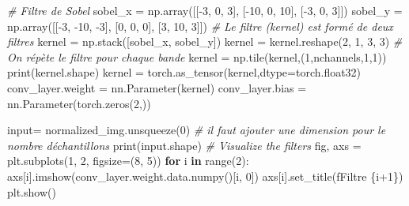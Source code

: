 \documentclass[
]{article}
\newenvironment{Shaded}{}{}
\newcommand{\BuiltInTok}[1]{\textcolor[rgb]{0.00,0.50,0.00}{#1}}
\newcommand{\CommentTok}[1]{\textcolor[rgb]{0.38,0.63,0.69}{\textit{#1}}}
\newcommand{\ControlFlowTok}[1]{\textcolor[rgb]{0.00,0.44,0.13}{\textbf{#1}}}
\newcommand{\DecValTok}[1]{\textcolor[rgb]{0.25,0.63,0.44}{#1}}
\newcommand{\KeywordTok}[1]{\textcolor[rgb]{0.00,0.44,0.13}{\textbf{#1}}}
\newcommand{\NormalTok}[1]{#1}
\newcommand{\OperatorTok}[1]{\textcolor[rgb]{0.40,0.40,0.40}{#1}}
\newcommand{\SpecialCharTok}[1]{\textcolor[rgb]{0.25,0.44,0.63}{#1}}
\newcommand{\SpecialStringTok}[1]{\textcolor[rgb]{0.73,0.40,0.53}{#1}}
\begin{document}
\begin{Shaded}
\begin{Highlighting}[]
\CommentTok{\# Filtre de Sobel}
\NormalTok{sobel\_x }\OperatorTok{=}\NormalTok{ np.array([[}\OperatorTok{{-}}\DecValTok{3}\NormalTok{, }\DecValTok{0}\NormalTok{, }\DecValTok{3}\NormalTok{], [}\OperatorTok{{-}}\DecValTok{10}\NormalTok{, }\DecValTok{0}\NormalTok{, }\DecValTok{10}\NormalTok{], [}\OperatorTok{{-}}\DecValTok{3}\NormalTok{, }\DecValTok{0}\NormalTok{, }\DecValTok{3}\NormalTok{]])}
\NormalTok{sobel\_y }\OperatorTok{=}\NormalTok{ np.array([[}\OperatorTok{{-}}\DecValTok{3}\NormalTok{, }\OperatorTok{{-}}\DecValTok{10}\NormalTok{, }\OperatorTok{{-}}\DecValTok{3}\NormalTok{], [}\DecValTok{0}\NormalTok{, }\DecValTok{0}\NormalTok{, }\DecValTok{0}\NormalTok{], [}\DecValTok{3}\NormalTok{, }\DecValTok{10}\NormalTok{, }\DecValTok{3}\NormalTok{]])}
\CommentTok{\# Le filtre (kernel) est formé de deux filtres}
\NormalTok{kernel }\OperatorTok{=}\NormalTok{ np.stack([sobel\_x, sobel\_y])}
\NormalTok{kernel }\OperatorTok{=}\NormalTok{ kernel.reshape(}\DecValTok{2}\NormalTok{, }\DecValTok{1}\NormalTok{, }\DecValTok{3}\NormalTok{, }\DecValTok{3}\NormalTok{)}
\CommentTok{\# On répète le filtre pour chaque bande}
\NormalTok{kernel }\OperatorTok{=}\NormalTok{ np.tile(kernel,(}\DecValTok{1}\NormalTok{,nchannels,}\DecValTok{1}\NormalTok{,}\DecValTok{1}\NormalTok{))}
\BuiltInTok{print}\NormalTok{(kernel.shape)}
\NormalTok{kernel }\OperatorTok{=}\NormalTok{ torch.as\_tensor(kernel,dtype}\OperatorTok{=}\NormalTok{torch.float32)}
\NormalTok{conv\_layer.weight }\OperatorTok{=}\NormalTok{ nn.Parameter(kernel)}
\NormalTok{conv\_layer.bias }\OperatorTok{=}\NormalTok{ nn.Parameter(torch.zeros(}\DecValTok{2}\NormalTok{,))}

\BuiltInTok{input}\OperatorTok{=}\NormalTok{ normalized\_img.unsqueeze(}\DecValTok{0}\NormalTok{) }\CommentTok{\# il faut ajouter une dimension pour le nombre d\textquotesingle{}échantillons}
\BuiltInTok{print}\NormalTok{(}\BuiltInTok{input}\NormalTok{.shape)}
\CommentTok{\# Visualize the filters}
\NormalTok{fig, axs }\OperatorTok{=}\NormalTok{ plt.subplots(}\DecValTok{1}\NormalTok{, }\DecValTok{2}\NormalTok{, figsize}\OperatorTok{=}\NormalTok{(}\DecValTok{8}\NormalTok{, }\DecValTok{5}\NormalTok{))}
\ControlFlowTok{for}\NormalTok{ i }\KeywordTok{in} \BuiltInTok{range}\NormalTok{(}\DecValTok{2}\NormalTok{):}
\NormalTok{    axs[i].imshow(conv\_layer.weight.data.numpy()[i, }\DecValTok{0}\NormalTok{])}
\NormalTok{    axs[i].set\_title(}\SpecialStringTok{f\textquotesingle{}Filtre }\SpecialCharTok{\{}\NormalTok{i}\OperatorTok{+}\DecValTok{1}\SpecialCharTok{\}}\SpecialStringTok{\textquotesingle{}}\NormalTok{)}
\NormalTok{plt.show()}
\end{Highlighting}
\end{Shaded}
\end{document}
